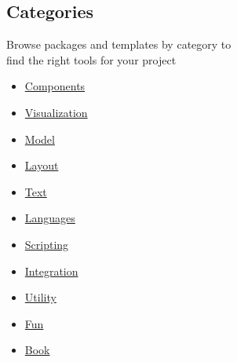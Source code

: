 \subsection{Categories}\label{categories}

Browse packages and templates by category to\\
find the right tools for your project

\begin{itemize}
\tightlist
\item
  \href{https://typst.app/universe/search/?category=components}{\pandocbounded{}
  Components}
\item
  \href{https://typst.app/universe/search/?category=visualization}{\pandocbounded{}
  Visualization}
\item
  \href{https://typst.app/universe/search/?category=model}{\pandocbounded{}
  Model}
\item
  \href{https://typst.app/universe/search/?category=layout}{\pandocbounded{}
  Layout}
\item
  \href{https://typst.app/universe/search/?category=text}{\pandocbounded{}
  Text}
\item
  \href{https://typst.app/universe/search/?category=languages}{\pandocbounded{}
  Languages}
\item
  \href{https://typst.app/universe/search/?category=scripting}{\pandocbounded{}
  Scripting}
\item
  \href{https://typst.app/universe/search/?category=integration}{\pandocbounded{}
  Integration}
\item
  \href{https://typst.app/universe/search/?category=utility}{\pandocbounded{}
  Utility}
\item
  \href{https://typst.app/universe/search/?category=fun}{\pandocbounded{}
  Fun}
\item
  \href{https://typst.app/universe/search/?category=book}{\pandocbounded{}
  Book}

\end{itemize}
